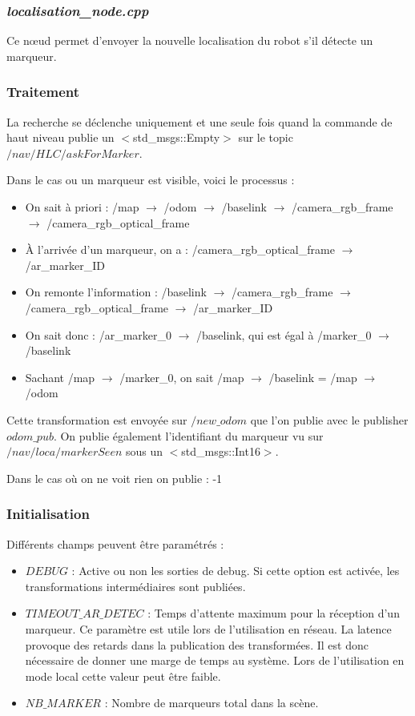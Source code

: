 \documentclass[10pt,a4paper]{article}
\begin{document}
\subsubsection{\textit{localisation\_node.cpp}}
Ce nœud permet d'envoyer la nouvelle localisation du robot s'il détecte un marqueur. 

\subsubsection{Traitement}
\noindent La recherche se déclenche uniquement et une seule fois quand la commande de haut niveau publie un $<$std\_msgs::Empty$>$ sur le topic $/nav/HLC/askForMarker$. 

\noindent Dans le cas ou un marqueur est visible, voici le processus : 
\begin{itemize}
\item On sait à priori : /map $\rightarrow$ /odom $\rightarrow$ /baselink $\rightarrow$ /camera\_rgb\_frame $\rightarrow$ /camera\_rgb\_optical\_frame 
\item À l'arrivée d'un marqueur, on a : /camera\_rgb\_optical\_frame $\rightarrow$ /ar\_marker\_ID 
\item On remonte l'information : /baselink $\rightarrow$ /camera\_rgb\_frame $\rightarrow$ /camera\_rgb\_optical\_frame $\rightarrow$ /ar\_marker\_ID
\item On sait donc : /ar\_marker\_0 $\rightarrow$ /baselink, qui est égal à /marker\_0 $\rightarrow$ /baselink 
\item Sachant /map $\rightarrow$ /marker\_0, on sait /map $\rightarrow$ /baselink = /map  $\rightarrow$ /odom 
\end{itemize}

Cette transformation est envoyée sur $/new\_odom$ que l'on publie avec le publisher $odom\_pub$. On publie également l'identifiant du marqueur vu sur $/nav/loca/markerSeen$ sous un $<$std\_msgs::Int16$>$. 

\noindent Dans le cas où on ne voit rien on publie : -1

\subsubsection{Initialisation}
\noindent Différents champs peuvent être paramétrés : 
\begin{itemize}
\item $DEBUG$ : Active ou non les sorties de debug. Si cette option est activée, les transformations intermédiaires sont publiées.
\item $TIMEOUT\_AR\_DETEC$ : Temps d'attente maximum pour la réception d'un marqueur. Ce paramètre est utile lors de l'utilisation en réseau. La latence provoque des retards dans la publication des transformées. Il est donc nécessaire de donner une marge de temps au système. Lors de l'utilisation en mode local cette valeur peut \^etre faible.
\item $NB\_MARKER$ : Nombre de marqueurs total dans la scène.
\end{itemize}
\end{document}
